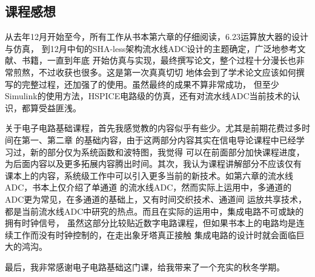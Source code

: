     \subsection{课程感想}
    从去年12月开始至今，所有工作从书本第六章的仔细阅读，6.23运算放大器的设计与仿真，
    到12月中旬的SHA-less架构流水线ADC设计的主题确定，广泛地参考文献、书籍，一直到年底
    开始仿真与实现，最终撰写论文，整个过程十分漫长也非常煎熬，不过收获也很多。这是第一次真真切切
    地体会到了学术论文应该如何撰写的完整过程，还加强了\text{\LaTeX}的使用。虽然最终的成果不算非常成功，
    但至少Simulink的使用方法，HSPICE电路级的仿真，还有对流水线ADC当前技术的认识，都算受益匪浅。
    \par 关于电子电路基础课程，首先我感觉教的内容似乎有些少。尤其是前期花费过多时间在第一、第二章
    的基础内容，由于这两部分内容其实在信电导论课程中已经学习过，新的部分仅为系统函数和波特图，我觉得
    可以在前面部分加快课程进度，为后面内容以及更多拓展内容腾出时间。其次，我认为课程讲解部分不应该仅有
    课本上的内容，系统级工作中可以引入更多当前的新技术。如第六章的流水线ADC，书本上仅介绍了单通道
    的流水线ADC，然而实际上运用中，多通道的ADC更为常见，在多通道的基础上，又有时间交织技术、通道间
    运放共享技术，都是当前流水线ADC中研究的热点。而且在实际的运用中，集成电路不可或缺的拥有时钟信号，
    虽然这部分比较贴近数字电路课程，但如果书本上的电路均是连续工作而没有时钟控制的，在走出象牙塔真正接触
    集成电路的设计时就会面临巨大的鸿沟。
    \par 最后，我非常感谢电子电路基础这门课，给我带来了一个充实的秋冬学期。

